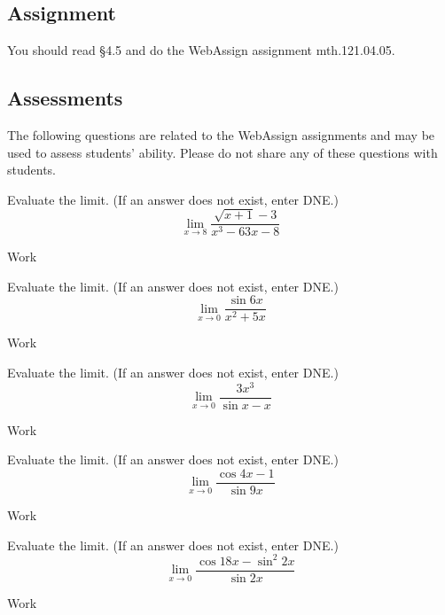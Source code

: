 \documentclass[12pt,addpoints, answers, fleqn]{exam}
\begin{document}
\subsection{Assignment}
You should read \S  4.5 and do the WebAssign assignment mth.121.04.05.
\vfill
\pagebreak
\begin{teacher}
\subsection{Assessments}
The following questions are related to the WebAssign assignments and may be used to assess students' ability. Please do not share any of these questions with students.
\begin{questions}		
\question 	%

Evaluate the limit. (If an answer does not exist, enter DNE.)
\[
\lim_{x \to 8} \frac{\sqrt{x+1}-3}{x^3-63x-8}
\]
\begin{solution}
Work
\end{solution}



\question 	%

Evaluate the limit. (If an answer does not exist, enter DNE.)
\[
\lim_{x \to 0} \frac{\sin 6x}{x^2 + 5x}
\]
\begin{solution}
Work
\end{solution}
 
 
\question 	%

Evaluate the limit. (If an answer does not exist, enter DNE.)
\[
\lim_{x \to 0} \frac{3x^3}{\sin x - x}
\]
\begin{solution}
Work
\end{solution}

\question 	%

Evaluate the limit. (If an answer does not exist, enter DNE.)
\[
\lim_{x \to 0} \frac{\cos 4x - 1}{\sin 9x}
\]
 \begin{solution}
Work
\end{solution}
 
\question 	%

Evaluate the limit. (If an answer does not exist, enter DNE.)
\[
\lim_{x \to 0} \frac{\cos 18x - \sin^2 2x}{\sin 2x}
\]
\begin{solution}
Work
\end{solution}



\end{questions}
\end{teacher}
\end{document}
